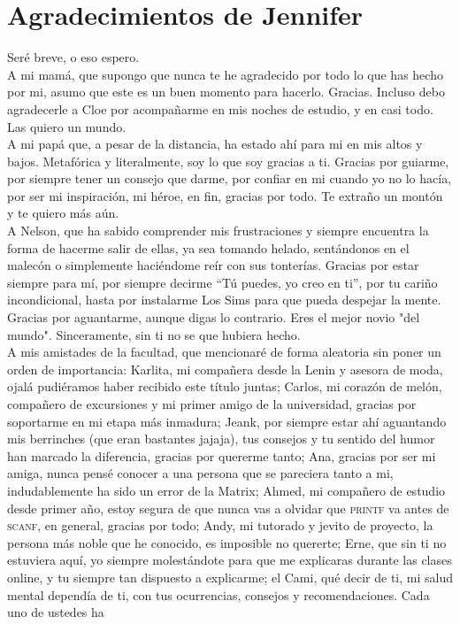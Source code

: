 \section*{Agradecimientos de Jennifer}
Seré breve, o eso espero. \\
 A mi mamá, que supongo que nunca te he agradecido por todo lo que has hecho por mi, asumo que este es un buen momento para hacerlo. Gracias. Incluso debo agradecerle a Cloe por acompañarme en mis noches de estudio, y en casi todo.  Las quiero un mundo.\\
A mi papá que, a pesar de la distancia, ha estado ahí para mi en mis altos y bajos. Metafórica y literalmente, soy lo que soy gracias a ti. Gracias por guiarme, por siempre tener un consejo que darme, por confiar en mi cuando yo no lo hacía, por ser mi inspiración, mi héroe, en fin, gracias por todo. Te extraño un montón y te quiero más aún. \\
A Nelson, que ha sabido comprender mis frustraciones y siempre encuentra la forma de hacerme salir de ellas, ya sea tomando helado, sentándonos en el malecón o simplemente haciéndome reír con sus tonterías. Gracias por estar siempre para mí, por siempre decirme “Tú puedes, yo creo en ti”, por tu cariño incondicional, hasta por instalarme Los Sims para que pueda despejar la mente. Gracias por aguantarme, aunque digas lo contrario. Eres el mejor novio "del mundo". Sinceramente, sin ti no se que hubiera hecho.\\
A mis amistades de la facultad, que mencionaré de forma aleatoria sin poner un orden de importancia: Karlita, mi compañera desde la Lenin y asesora de moda, ojalá pudiéramos haber recibido este título juntas; Carlos, mi corazón de melón, compañero de excursiones y mi primer amigo de la universidad, gracias por soportarme en mi etapa más inmadura; Jeank, por siempre estar ahí aguantando mis berrinches (que eran bastantes jajaja), tus consejos y tu sentido del humor han marcado la diferencia, gracias por quererme tanto; Ana, gracias por ser mi amiga, nunca pensé conocer a una persona que se pareciera tanto a mi, indudablemente ha sido un error de la Matrix; Ahmed, mi compañero de estudio desde primer año, estoy segura de que nunca vas a olvidar que \textsc{printf} va antes de \textsc{scanf}, en general, gracias por todo; Andy, mi tutorado y jevito de proyecto, la persona más noble que he conocido, es imposible no quererte; Erne, que sin ti no estuviera aquí, yo siempre molestándote para que me explicaras durante las clases online, y tu siempre tan dispuesto a explicarme; el Cami, qué decir de ti, mi salud mental dependía de ti, con tus ocurrencias, consejos y recomendaciones.  Cada uno de ustedes ha
